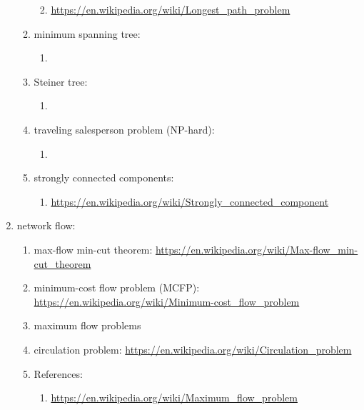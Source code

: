 \begin{enumerate}
\begin{enumerate}
\begin{enumerate}
\begin{enumerate}
			\end{enumerate}
		\item \url{https://en.wikipedia.org/wiki/Longest_path_problem}
		\end{enumerate}
	\item minimum spanning tree: \vspace{-0.2cm}
		\begin{enumerate} \itemsep -2pt
		\item 
		\end{enumerate}
	\item Steiner tree: \vspace{-0.2cm}
		\begin{enumerate} \itemsep -2pt
		\item 
		\end{enumerate}
	\item traveling salesperson problem (NP-hard): \vspace{-0.2cm}
		\begin{enumerate} \itemsep -2pt
		\item 
		\end{enumerate}
	\item strongly connected components: \vspace{-0.2cm}
		\begin{enumerate} \itemsep -2pt
		\item \url{https://en.wikipedia.org/wiki/Strongly_connected_component}
		\end{enumerate}
	\end{enumerate}
\item network flow: \vspace{-0.3cm}
	\begin{enumerate} \itemsep -2pt
	\item max-flow min-cut theorem: \url{https://en.wikipedia.org/wiki/Max-flow_min-cut_theorem}
	\item minimum-cost flow problem (MCFP): \url{https://en.wikipedia.org/wiki/Minimum-cost_flow_problem}
	\item maximum flow problems
	\item circulation problem: \url{https://en.wikipedia.org/wiki/Circulation_problem}
	\item References: \vspace{-0.2cm}
		\begin{enumerate} \itemsep -2pt
		\item \url{https://en.wikipedia.org/wiki/Maximum_flow_problem}
		\end{enumerate}
	\end{enumerate}

\end{enumerate}
